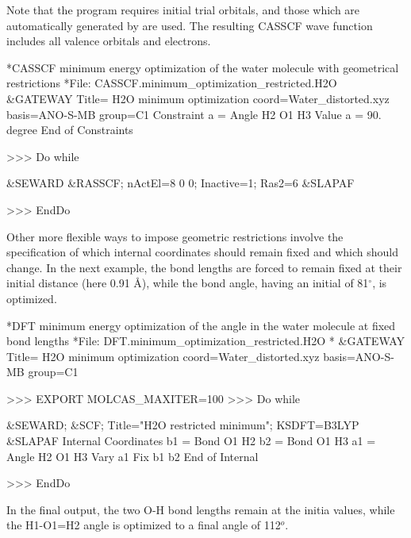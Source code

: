 Note that the  program requires initial trial orbitals, and those  
which are automatically generated by  are used.  The resulting CASSCF 
wave function includes all valence orbitals and electrons.

\begin{inputlisting}
*CASSCF minimum energy optimization of the water molecule with geometrical restrictions
*File: CASSCF.minimum_optimization_restricted.H2O
&GATEWAY 
 Title= H2O minimum optimization
 coord=Water_distorted.xyz
 basis=ANO-S-MB
 group=C1
Constraint
   a = Angle H2 O1 H3
  Value
   a = 90. degree
End of Constraints

>>> Do while
   
 &SEWARD 
 &RASSCF; nActEl=8 0 0; Inactive=1; Ras2=6
 &SLAPAF 

>>> EndDo
\end{inputlisting}

Other more flexible ways to impose geometric restrictions involve the specification of which internal
coordinates should remain fixed and which should change. In the next example, 
the bond lengths are forced to remain fixed at their initial distance (here 0.91 \AA), while the
bond angle, having an initial of 81$^\circ$, is optimized.

\begin{inputlisting}
*DFT minimum energy optimization of the angle in the water molecule at fixed bond lengths
*File: DFT.minimum_optimization_restricted.H2O
*
&GATEWAY 
 Title= H2O minimum optimization
 coord=Water_distorted.xyz
 basis=ANO-S-MB
 group=C1

>>> EXPORT MOLCAS_MAXITER=100
>>> Do while
                                                                                                                                                                            
 &SEWARD; &SCF; Title="H2O restricted minimum"; KSDFT=B3LYP
 &SLAPAF 
  Internal Coordinates
     b1 = Bond O1 H2
     b2 = Bond O1 H3
     a1 = Angle H2 O1 H3
  Vary
     a1
  Fix
     b1
     b2
  End of Internal

>>> EndDo
\end{inputlisting}

In the final output, the two O-H bond lengths remain at the initia values, while the H1-O1=H2 angle is optimized
to a final angle of 112$^o$.

